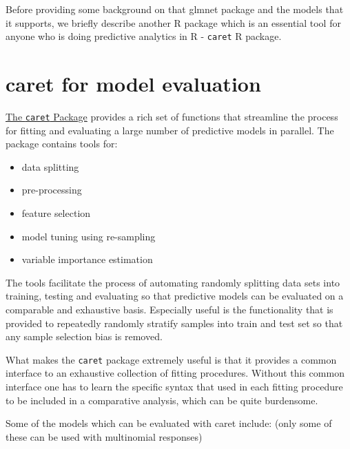 \documentclass[
]{book}
\providecommand{\tightlist}{%
  \setlength{\itemsep}{0pt}\setlength{\parskip}{0pt}}
\begin{document}
Before providing some background on that glmnet package and the
models that it supports, we briefly describe another R package
which is an essential tool for anyone who is doing predictive analytics in R - \texttt{caret} R package.

\hypertarget{caret-for-model-evaluation}{%
\section{caret for model evaluation}\label{caret-for-model-evaluation}}

\href{https://topepo.github.io/caret/index.html}{The \texttt{caret} Package}
provides a rich set of functions that streamline the process for fitting and
evaluating a large number of predictive models in parallel. The package contains tools for:

\begin{itemize}
\tightlist
\item
  data splitting\\
\item
  pre-processing\\
\item
  feature selection\\
\item
  model tuning using re-sampling\\
\item
  variable importance estimation
\end{itemize}

The tools facilitate the process of automating randomly splitting data sets into training,
testing and evaluating so that predictive models can be evaluated on a comparable and
exhaustive basis. Especially useful is the functionality that is provided to
repeatedly randomly stratify samples into train and test set so that any
sample selection bias is removed.

What makes the \texttt{caret} package extremely useful is that it provides a common interface
to an exhaustive collection of fitting procedures. Without
this common interface one has to learn the specific syntax that
used in each fitting procedure to be included in a comparative analysis,
which can be quite burdensome.

Some of the models which can be evaluated with caret include:
(only some of these can be used with multinomial responses)
\end{document}
